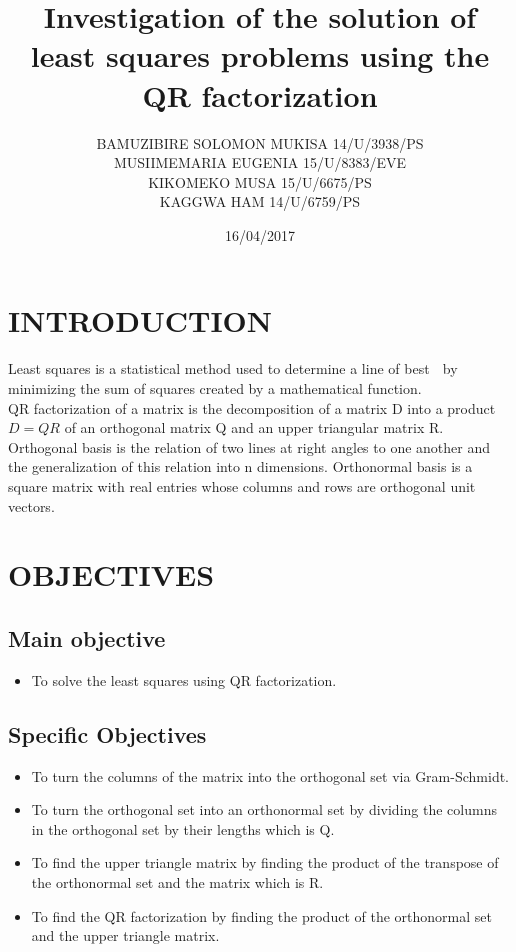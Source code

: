 \documentclass[12pt, letterpaper]{article}
\begin{document}
    \title{\textbf{Investigation of the solution of least squares problems using the QR factorization}}
    \author{BAMUZIBIRE SOLOMON MUKISA 14/U/3938/PS\\ MUSIIMEMARIA EUGENIA 15/U/8383/EVE \\KIKOMEKO MUSA 15/U/6675/PS \\ KAGGWA HAM 14/U/6759/PS\\ }
    \date{16/04/2017}
    \maketitle
\section{\textbf{INTRODUCTION} } 
    Least  squares is a statistical method used to determine a line of best 
    by minimizing the sum of squares created by a mathematical function.\\
    
    QR factorization of a matrix is the decomposition of a matrix D into a product 
    $D=QR$ of an orthogonal matrix Q and an upper triangular matrix R. Orthogonal basis is the relation of two lines at right angles to one another and the generalization of this relation into n dimensions. Orthonormal basis is a square matrix with real entries whose columns and rows are orthogonal unit vectors.\\ 
\section{\textbf{OBJECTIVES}}
\subsection{\textbf{Main objective}}
\begin{itemize}
    \item To solve the least squares using QR factorization.
\end{itemize}

\subsection{\textbf{Specific Objectives}}
\begin{itemize}
    \item To turn the columns of the matrix into the orthogonal set via Gram-Schmidt. \\
    \item To turn the orthogonal set into an orthonormal set by dividing the columns in the orthogonal set by their lengths which is Q.\\
    \item To find the upper triangle matrix by finding the product of the transpose of the orthonormal set and the matrix which is R.\\
    \item To find the QR factorization by finding the product of the orthonormal set and the upper triangle matrix.\\
\end{itemize}
\end{document}
